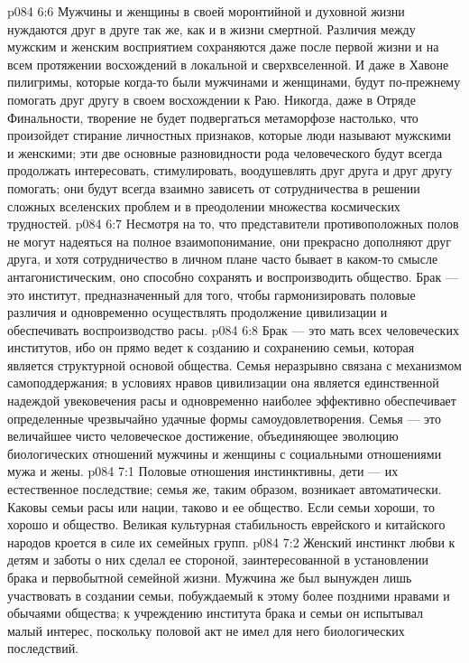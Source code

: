 \vs p084 6:6 Мужчины и женщины в своей моронтийной и духовной жизни нуждаются друг в друге так же, как и в жизни смертной. Различия между мужским и женским восприятием сохраняются даже после первой жизни и на всем протяжении восхождений в локальной и сверхвселенной. И даже в Хавоне пилигримы, которые когда\hyp{}то были мужчинами и женщинами, будут по\hyp{}прежнему помогать друг другу в своем восхождении к Раю. Никогда, даже в Отряде Финальности, творение не будет подвергаться метаморфозе настолько, что произойдет стирание личностных признаков, которые люди называют мужскими и женскими; эти две основные разновидности рода человеческого будут всегда продолжать интересовать, стимулировать, воодушевлять друг друга и друг другу помогать; они будут всегда взаимно зависеть от сотрудничества в решении сложных вселенских проблем и в преодолении множества космических трудностей.
\vs p084 6:7 \pc Несмотря на то, что представители противоположных полов не могут надеяться на полное взаимопонимание, они прекрасно дополняют друг друга, и хотя сотрудничество в личном плане часто бывает в каком\hyp{}то смысле антагонистическим, оно способно сохранять и воспроизводить общество. Брак --- это институт, предназначенный для того, чтобы гармонизировать половые различия и одновременно осуществлять продолжение цивилизации и обеспечивать воспроизводство расы.
\vs p084 6:8 Брак --- это мать всех человеческих институтов, ибо он прямо ведет к созданию и сохранению семьи, которая является структурной основой общества. Семья неразрывно связана с механизмом самоподдержания; в условиях нравов цивилизации она является единственной надеждой увековечения расы и одновременно наиболее эффективно обеспечивает определенные чрезвычайно удачные формы самоудовлетворения. Семья --- это величайшее чисто человеческое достижение, объединяющее эволюцию биологических отношений мужчины и женщины с социальными отношениями мужа и жены.
\vs p084 7:1 Половые отношения инстинктивны, дети --- их естественное последствие; семья же, таким образом, возникает автоматически. Каковы семьи расы или нации, таково и ее общество. Если семьи хороши, то хорошо и общество. Великая культурная стабильность еврейского и китайского народов кроется в силе их семейных групп.
\vs p084 7:2 Женский инстинкт любви к детям и заботы о них сделал ее стороной, заинтересованной в установлении брака и первобытной семейной жизни. Мужчина же был вынужден лишь участвовать в создании семьи, побуждаемый к этому более поздними нравами и обычаями общества; к учреждению института брака и семьи он испытывал малый интерес, поскольку половой акт не имел для него биологических последствий.
